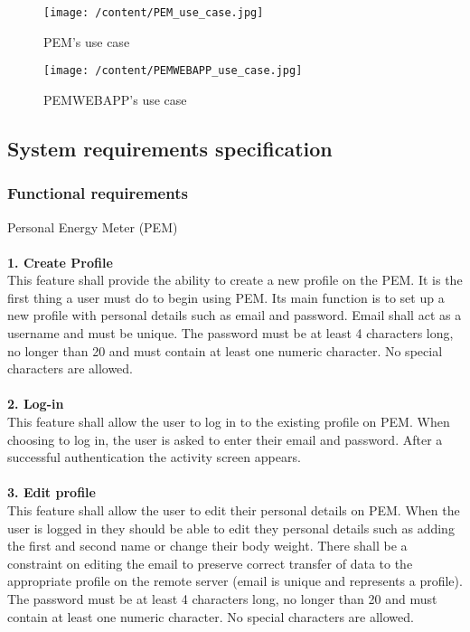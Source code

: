 \documentclass[12pt, a4paper]{report}   %
\begin{document}
\begin{enumerate}
\begin{figure}[H]
  \centering
	\texttt{[image: /content/PEM\_use\_case.jpg]}
	  \caption{PEM's use case}
\end{figure}

\begin{figure}[H]
  \centering
	\texttt{[image: /content/PEMWEBAPP\_use\_case.jpg]}
	  \caption{PEMWEBAPP's use case}
\end{figure}


\subsection{System requirements specification}
\subsubsection{Functional requirements}
Personal Energy Meter (PEM)\\ \\
\textbf{1. Create Profile}\\
This feature shall provide the ability to create a new profile on the PEM. It is the first thing a user must do to begin using PEM. Its main function is to set up a new profile with personal details such as email and password. Email shall act as a username and must be unique. The password must be at least 4 characters long, no longer than 20 and must contain at least one numeric character. No special characters are allowed.\\ \\
\textbf{2. Log-in}\\
This feature shall allow the user to log in to the existing profile on PEM. When choosing to log in, the user is asked to enter their email and password. After a successful authentication the activity screen appears.\\ \\
\textbf{3. Edit profile}\\
This feature shall allow the user to edit their personal details on PEM. When the user is logged in they should be able to edit they personal details such as adding the first and second name or change their body weight. There shall be a constraint on editing the email to preserve correct transfer of data to the appropriate profile on the remote server (email is unique and represents a profile). The password must be at least 4 characters long, no longer than 20 and must contain at least one numeric character. No special characters are allowed.\\ \\

\end{enumerate}
\end{document}
